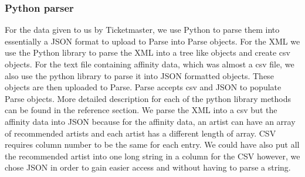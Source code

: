 	  \subsubsection{Python parser}
	    For the data given to us by Ticketmaster, we use Python to parse them into essentially a JSON format to upload to Parse into Parse 
	    objects. For the XML we use the Python library to parse the XML into a tree like objects and create csv objects. For the text file containing 
	    affinity data, which was almost a csv file, we also use the python library to parse it into JSON formatted objects. These objects are then 
	    uploaded to Parse. Parse accepts csv and JSON to populate Parse objects. More detailed description for each of the python library 
	    methods can be found in the reference section. We parse the XML into a csv but the affinity data into JSON because for the affinity data, 
	    an artist can have an array of recommended artists and each artist has a different length of array. CSV requires column number to be the 
	    same for each entry. We could have also put all the recommended artist into one long string in a column for the CSV however, we chose 
	    JSON in order to gain easier access and without having to parse a string. 
	  
	    